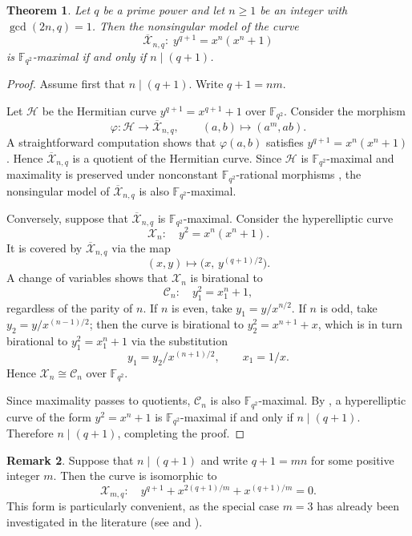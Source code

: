 \documentclass[12pt]{amsart}
\newtheorem{theorem}{Theorem}[section]
\theoremstyle{remark}
\theoremstyle{definition}
\newtheorem{remark}[theorem]{Remark}
\begin{document}
\begin{theorem}\label{thm:maximal}
Let $q$ be a prime power and let $n \ge 1$ be an integer with 
$\gcd(2n,q)=1$. Then the nonsingular model of the curve
\[
\overline{\mathcal{X}}_{n,q}:\; y^{q+1}=x^{n}(x^{n}+1)
\]
is $\mathbb{F}_{q^2}$\textnormal{-maximal} if and only if 
$n \mid (q+1)$.
\end{theorem}

\begin{proof}
Assume first that $n \mid (q+1)$. Write $q+1 = nm$.

Let $\mathcal{H}$ be the Hermitian curve $y^{q+1}=x^{q+1}+1$ over 
$\mathbb{F}_{q^{2}}$. Consider the morphism
\[
\varphi:\mathcal{H}\longrightarrow \overline{\mathcal{X}}_{n,q},
\qquad (a,b)\mapsto (a^{m},ab).
\]
A straightforward computation shows that $\varphi(a,b)$ satisfies 
$y^{q+1}=x^{n}(x^{n}+1)$. Hence $\overline{\mathcal{X}}_{n,q}$ is 
a quotient of the Hermitian curve. Since $\mathcal{H}$ is 
$\mathbb{F}_{q^{2}}$-maximal and maximality is preserved under 
nonconstant $\mathbb{F}_{q^2}$-rational morphisms \cite{Serre}, 
the nonsingular model of $\overline{\mathcal{X}}_{n,q}$ is also 
$\mathbb{F}_{q^{2}}$-maximal.

\medskip
Conversely, suppose that $\overline{\mathcal{X}}_{n,q}$ is 
$\mathbb{F}_{q^{2}}$-maximal. Consider the hyperelliptic curve
\[
\mathcal{X}_{n} : \quad y^{2} = x^{n}(x^{n} + 1).
\]
It is covered by $\overline{\mathcal{X}}_{n,q}$ via the map
\[
(x,y) \longmapsto \bigl(x,\, y^{(q+1)/2}\bigr).
\]
A change of variables shows that $\mathcal{X}_{n}$ is birational to
\[
\mathcal{C}_{n} : \quad y_{1}^{2} = x_1^{n} + 1,
\]
regardless of the parity of $n$. If $n$ is even, take 
$y_{1} = y / x^{n/2}$. If $n$ is odd, take 
$y_{2} = y / x^{(n-1)/2}$; then the curve is birational to 
$y_2^2 = x^{n+1} + x$, which is in turn birational to 
$y_1^2 = x_1^n + 1$ via the substitution
\[
y_1 = y_2/x^{(n+1)/2}, \qquad x_1 = 1/x.
\]
Hence $\mathcal{X}_{n} \cong \mathcal{C}_{n}$ over 
$\mathbb{F}_{q^{2}}$.

Since maximality passes to quotients, $\mathcal{C}_{n}$ is also 
$\mathbb{F}_{q^{2}}$-maximal. By \cite[Theorem~1]{Tafazolian2}, 
a hyperelliptic curve of the form $y^{2} = x^{n} + 1$ is 
$\mathbb{F}_{q^{2}}$-maximal if and only if $n \mid (q+1)$. 
Therefore $n \mid (q+1)$, completing the proof.
\end{proof}

\begin{remark}
\rm{Suppose that $n \mid (q+1)$ and write $q+1 = mn$ for some positive 
integer $m$. Then the curve is isomorphic to
\[
\mathcal{X}_{m,q} : \quad y^{q+1} + x^{2(q+1)/m} + x^{(q+1)/m} = 0.
\]
This form is particularly convenient, as the special case $m=3$ 
has already been investigated in the literature 
(see \cite[Example~5.1]{KT1} and \cite{BMV, FM}).}
\end{remark}
\end{document}
